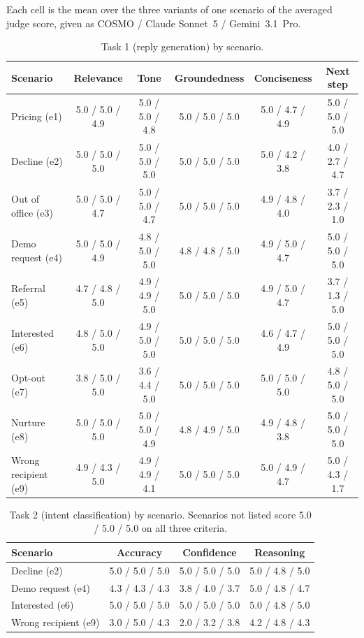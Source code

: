 \documentclass[a4paper]{article}
\begin{document}
Each cell is the mean over the three variants of one scenario of the averaged
judge score, given as COSMO / Claude Sonnet~5 / Gemini~3.1~Pro.

\begin{table}[H]
\centering
\caption{Task 1 (reply generation) by scenario.}
\label{tab:scenario-reply}
\footnotesize
\begin{tabular}{lccccc}
\toprule
\textbf{Scenario} & \textbf{Relevance} & \textbf{Tone} & \textbf{Groundedness} & \textbf{Conciseness} & \textbf{Next step} \\
\midrule
Pricing (e1)          & 5.0 / 5.0 / 4.9 & 5.0 / 5.0 / 4.8 & 5.0 / 5.0 / 5.0 & 5.0 / 4.7 / 4.9 & 5.0 / 5.0 / 5.0 \\
Decline (e2)          & 5.0 / 5.0 / 5.0 & 5.0 / 5.0 / 5.0 & 5.0 / 5.0 / 5.0 & 5.0 / 4.2 / 3.8 & 4.0 / 2.7 / 4.7 \\
Out of office (e3)    & 5.0 / 5.0 / 4.7 & 5.0 / 5.0 / 4.7 & 5.0 / 5.0 / 5.0 & 4.9 / 4.8 / 4.0 & 3.7 / 2.3 / 1.0 \\
Demo request (e4)     & 5.0 / 5.0 / 4.9 & 4.8 / 5.0 / 5.0 & 4.8 / 4.8 / 5.0 & 4.9 / 5.0 / 4.7 & 5.0 / 5.0 / 5.0 \\
Referral (e5)         & 4.7 / 4.8 / 5.0 & 4.9 / 4.9 / 5.0 & 5.0 / 5.0 / 5.0 & 4.9 / 5.0 / 4.7 & 3.7 / 1.3 / 5.0 \\
Interested (e6)       & 4.8 / 5.0 / 5.0 & 4.9 / 5.0 / 5.0 & 5.0 / 5.0 / 5.0 & 4.6 / 4.7 / 4.9 & 5.0 / 5.0 / 5.0 \\
Opt-out (e7)          & 3.8 / 5.0 / 5.0 & 3.6 / 4.4 / 5.0 & 5.0 / 5.0 / 5.0 & 5.0 / 5.0 / 5.0 & 4.8 / 5.0 / 5.0 \\
Nurture (e8)          & 5.0 / 5.0 / 5.0 & 5.0 / 5.0 / 4.9 & 4.8 / 4.9 / 5.0 & 4.9 / 4.8 / 3.8 & 5.0 / 5.0 / 5.0 \\
Wrong recipient (e9)  & 4.9 / 4.3 / 5.0 & 4.9 / 4.9 / 4.1 & 5.0 / 5.0 / 5.0 & 5.0 / 4.9 / 4.7 & 5.0 / 4.3 / 1.7 \\
\bottomrule
\end{tabular}
\end{table}

\begin{table}[H]
\centering
\caption{Task 2 (intent classification) by scenario. Scenarios not listed
score 5.0 / 5.0 / 5.0 on all three criteria.}
\label{tab:scenario-intent}
\footnotesize
\begin{tabular}{lccc}
\toprule
\textbf{Scenario} & \textbf{Accuracy} & \textbf{Confidence} & \textbf{Reasoning} \\
\midrule
Decline (e2)          & 5.0 / 5.0 / 5.0 & 5.0 / 5.0 / 5.0 & 5.0 / 4.8 / 5.0 \\
Demo request (e4)     & 4.3 / 4.3 / 4.3 & 3.8 / 4.0 / 3.7 & 5.0 / 4.8 / 4.7 \\
Interested (e6)       & 5.0 / 5.0 / 5.0 & 5.0 / 5.0 / 5.0 & 5.0 / 4.8 / 5.0 \\
Wrong recipient (e9)  & 3.0 / 5.0 / 4.3 & 2.0 / 3.2 / 3.8 & 4.2 / 4.8 / 4.3 \\
\bottomrule
\end{tabular}
\end{table}
\end{document}
